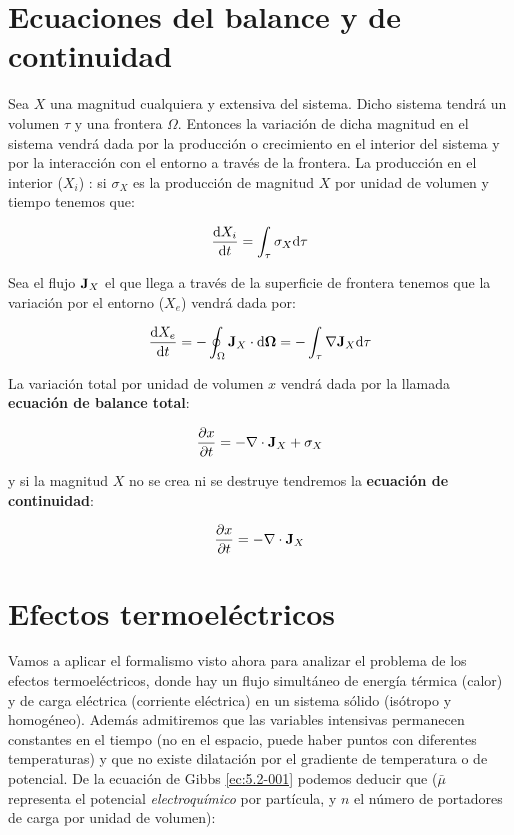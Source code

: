 \documentclass[12pt]{book}
\begin{document}
\section{Ecuaciones del balance y de continuidad}

Sea $X$ una magnitud cualquiera y extensiva del sistema. Dicho sistema tendrá un volumen $\tau$ y una frontera $\Omega$. Entonces la variación de dicha magnitud en el sistema vendrá dada por la producción o crecimiento en el interior del sistema y por la interacción con el entorno a través de la frontera. La producción en el interior ($X_i$) : si $\sigma_X$ es la producción de magnitud $X$ por unidad de volumen y tiempo tenemos que:

\begin{equation}
\dfrac{\mathrm{d} X_i}{\mathrm{d} t} = \int_{\tau} \sigma_X \mathrm{d} \tau
\end{equation}
 
Sea el flujo $\textbf{J}_X$ el que llega a través de la superficie de frontera tenemos que la variación por el entorno ($X_e$) vendrá dada por:

\begin{equation}
\dfrac{\mathrm{d} X_e}{\mathrm{d} t} = - \oint_{\Omega} \textbf{J}_X  \cdot \mathrm{d} \mathbf{\Omega} =  - \int_{\tau} \nabla \textbf{J}_X \mathrm{d} \tau
\end{equation}

La variación total por unidad de volumen $x$ vendrá dada por la llamada \textbf{ecuación de balance total}:

\begin{equation}
\frac{\partial x}{\partial t} = - \nabla \cdot \textbf{J}_X + \sigma_X
\end{equation}

y si la magnitud $X$ no se crea ni se destruye tendremos la \textbf{ecuación de continuidad}:

\begin{equation}
\frac{\partial x}{\partial t} = - \nabla \cdot \textbf{J}_X
\end{equation}


\section{Efectos termoeléctricos}

Vamos a aplicar el formalismo visto ahora para analizar el problema de los efectos termoeléctricos, donde hay un flujo simultáneo de energía térmica (calor) y de carga eléctrica (corriente eléctrica) en un sistema sólido (isótropo y homogéneo). Además admitiremos que las variables intensivas permanecen constantes en el tiempo (no en el espacio, puede haber puntos con diferentes temperaturas) y que no existe dilatación por el gradiente de temperatura o de potencial. De la ecuación de Gibbs \ref{ec:5.2-001} podemos deducir que ($\bar{\mu}$ representa el potencial \textit{electroquímico} por partícula, y $n$ el número de portadores de carga por unidad de volumen):
\end{document}
